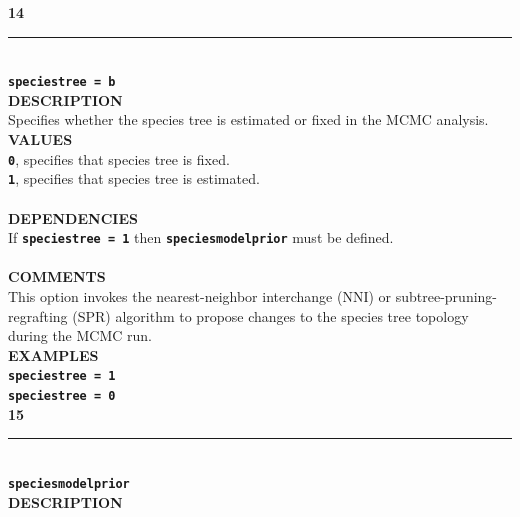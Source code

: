 \documentclass[a4paper]{book}
\numberwithin{equation}{section} \renewcommand{\baselinestretch}{0.55}
\begin{document}
\textbf{{\large 14}} \\
\noindent\rule{\textwidth}{0.8pt} \\
\textbf{{\Large \texttt{speciestree = b}}} \vspace{5pt}\\
\textbf{DESCRIPTION} \vspace{5pt}\\
Specifies whether the species tree is estimated or fixed in the MCMC
analysis.
\vspace{5pt}\\
\textbf{VALUES} \vspace{5pt}\\
\textbf{\texttt{0}}, specifies that species tree is fixed.  \vspace{5pt}\\
\textbf{\texttt{1}}, specifies that species tree is estimated. \vspace{5pt}\\
\textbf{\texttt{}} \vspace{5pt}\\
\textbf{DEPENDENCIES} \vspace{5pt}\\
If \textbf{\texttt{speciestree = 1}} then \textbf{\texttt{speciesmodelprior}} must be defined. \vspace{5pt}\\
\vspace{5pt}\\
\textbf{COMMENTS} \vspace{5pt}\\
This option invokes the nearest-neighbor interchange (NNI) or
subtree-pruning-regrafting (SPR) algorithm to propose changes to the
species tree topology during the MCMC run.
\vspace{5pt}\\
\textbf{EXAMPLES} \vspace{5pt}\\
\textbf{\texttt{speciestree = 1}} \vspace{5pt}\\
\textbf{\texttt{speciestree = 0}}\vspace{10pt}\\
\textbf{{\large 15}} \\
\noindent\rule{\textwidth}{0.8pt} \\
\textbf{{\Large \texttt{speciesmodelprior}}} \vspace{5pt}\\
\textbf{DESCRIPTION} \vspace{5pt}\\
\end{document}
